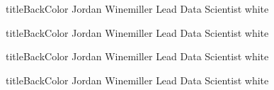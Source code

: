 \documentclass[11pt, oneside, letterpaper, titlepage]{article}
\begin{document}
    \pageFooter

    \newpage

    \newPageHeader
    {titleBackColor}
    {Jordan}
    {Winemiller}
    {Lead Data Scientist}
    {white}

    \hspace*{-0.01 in}

    \pageFooter

    \newpage

    \newPageHeader
    {titleBackColor}
    {Jordan}
    {Winemiller}
    {Lead Data Scientist}
    {white}

    \hspace*{-0.01 in}

    \pageFooter

    \newpage

    \newPageHeader
    {titleBackColor}
    {Jordan}
    {Winemiller}
    {Lead Data Scientist}
    {white}

    \hspace*{-0.01 in}

    \pageFooter

    \newpage

    \newPageHeader
    {titleBackColor}
    {Jordan}
    {Winemiller}
    {Lead Data Scientist}
    {white}
\end{document}
